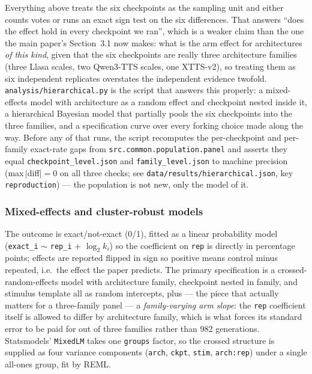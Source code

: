 \documentclass[11pt]{article}
\begin{document}
Everything above treats the six checkpoints as the sampling unit and either
counts votes or runs an exact sign test on the six differences. That answers
``does the effect hold in every checkpoint we ran'', which is a weaker claim
than the one the main paper's Section~3.1 now makes: what is the arm effect
for architectures \emph{of this kind}, given that the six checkpoints are
really three architecture families (three Llasa scales, two Qwen3-TTS scales,
one XTTS-v2), so treating them as six independent replicates overstates the
independent evidence twofold. \texttt{analysis/hierarchical.py} is the script
that answers this properly: a mixed-effects model with architecture as a
random effect and checkpoint nested inside it, a hierarchical Bayesian model
that partially pools the six checkpoints into the three families, and a
specification curve over every forking choice made along the way. Before any
of that runs, the script recomputes the per-checkpoint and per-family exact-rate
gaps from \texttt{src.common.population.panel} and asserts they equal
\texttt{checkpoint\_level.json} and \texttt{family\_level.json} to machine
precision (max\,$|$diff$|=0$ on all three checks; see
\texttt{data/results/hierarchical.json}, key \texttt{reproduction}) --- the
population is not new, only the model of it.

\subsubsection{Mixed-effects and cluster-robust models}

The outcome is exact/not-exact (0/1), fitted as a linear probability model
(\texttt{exact\_i} $\sim$ \texttt{rep\_i} + $\log_2 k_i$) so the coefficient on
\texttt{rep} is directly in percentage points; effects are reported flipped in
sign so positive means control minus repeated, i.e.\ the effect the paper
predicts. The primary specification is a crossed-random-effects model with
architecture family, checkpoint nested in family, and stimulus template all as
random intercepts, plus --- the piece that actually matters for a three-family
panel --- a \emph{family-varying arm slope}: the \texttt{rep} coefficient itself
is allowed to differ by architecture family, which is what forces its standard
error to be paid for out of three families rather than 982 generations.
Statsmodels' \texttt{MixedLM} takes one \texttt{groups} factor, so the crossed
structure is supplied as four variance components (\texttt{arch},
\texttt{ckpt}, \texttt{stim}, \texttt{arch:rep}) under a single all-ones group,
fit by REML.
\end{document}
